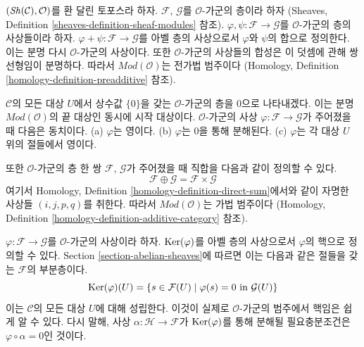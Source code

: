 \noindent
$(\mathop{\mathit{Sh}}\nolimits(\mathcal{C}), \mathcal{O})$를 환 달린 토포스라 하자.
$\mathcal{F}$, $\mathcal{G}$를 $\mathcal{O}$-가군의 층이라 하자
(Sheaves, Definition \ref{sheaves-definition-sheaf-modules} 참조).
$\varphi, \psi : \mathcal{F} \to \mathcal{G}$를
$\mathcal{O}$-가군의 층의 사상들이라 하자.
$\varphi + \psi : \mathcal{F} \to \mathcal{G}$를 아벨 층의 사상으로서
$\varphi$와 $\psi$의 합으로 정의한다. 이는 분명 다시
$\mathcal{O}$-가군의 사상이다. 또한 $\mathcal{O}$-가군의 사상들의
합성은 이 덧셈에 관해 쌍선형임이 분명하다. 따라서
$\textit{Mod}(\mathcal{O})$는 전가법 범주이다
(Homology, Definition \ref{homology-definition-preadditive} 참조).

\medskip\noindent
$\mathcal{C}$의 모든 대상 $U$에서 상수값 $\{0\}$을 갖는
$\mathcal{O}$-가군의 층을 $0$으로 나타내겠다. 이는 분명
$\textit{Mod}(\mathcal{O})$의 끝 대상인 동시에 시작 대상이다.
$\mathcal{O}$-가군의 사상
$\varphi : \mathcal{F} \to \mathcal{G}$가 주어졌을 때 다음은 동치이다.
(a) $\varphi$는 영이다. (b) $\varphi$는 $0$을 통해 분해된다.
(c) $\varphi$는 각 대상 $U$ 위의 절들에서 영이다.

\medskip\noindent
또한 $\mathcal{O}$-가군의 층 한 쌍
$\mathcal{F}$, $\mathcal{G}$가 주어졌을 때 직합을 다음과 같이 정의할 수 있다.
$$
\mathcal{F} \oplus \mathcal{G} = \mathcal{F} \times \mathcal{G}
$$
여기서 Homology, Definition \ref{homology-definition-direct-sum}에서와 같이
자명한 사상들 $(i, j, p, q)$를 취한다. 따라서
$\textit{Mod}(\mathcal{O})$는 가법 범주이다
(Homology, Definition \ref{homology-definition-additive-category} 참조).

\medskip\noindent
$\varphi : \mathcal{F} \to \mathcal{G}$를 $\mathcal{O}$-가군의
사상이라 하자. $\mathop{\mathrm{Ker}}(\varphi)$를 아벨 층의 사상으로서 $\varphi$의
핵으로 정의할 수 있다. Section \ref{section-abelian-sheaves}에 따르면
이는 다음과 같은 절들을 갖는 $\mathcal{F}$의 부분층이다.
$$
\mathop{\mathrm{Ker}}(\varphi)(U) =
\{ s \in \mathcal{F}(U) \mid \varphi(s) = 0 \text{ in } \mathcal{G}(U)\}
$$
이는 $\mathcal{C}$의 모든 대상 $U$에 대해 성립한다. 이것이 실제로
$\mathcal{O}$-가군의 범주에서 핵임은 쉽게 알 수 있다. 다시 말해,
사상 $\alpha : \mathcal{H} \to \mathcal{F}$가 $\mathop{\mathrm{Ker}}(\varphi)$를 통해
분해될 필요충분조건은 $\varphi \circ \alpha = 0$인 것이다.

